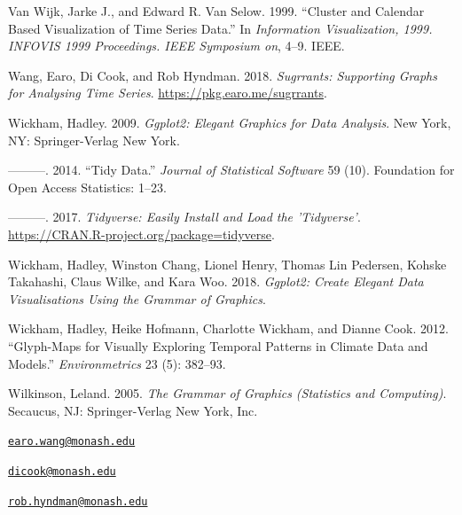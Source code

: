 \leavevmode\hypertarget{ref-VanWijkCluster1999}{}%
Van Wijk, Jarke J., and Edward R. Van Selow. 1999. ``Cluster and
Calendar Based Visualization of Time Series Data.'' In \emph{Information
Visualization, 1999. INFOVIS 1999 Proceedings. IEEE Symposium on}, 4--9.
IEEE.

\leavevmode\hypertarget{ref-R-sugrrants}{}%
Wang, Earo, Di Cook, and Rob Hyndman. 2018. \emph{Sugrrants: Supporting
Graphs for Analysing Time Series}. \url{https://pkg.earo.me/sugrrants}.

\leavevmode\hypertarget{ref-wickham2009ggplot2}{}%
Wickham, Hadley. 2009. \emph{Ggplot2: Elegant Graphics for Data
Analysis}. New York, NY: Springer-Verlag New York.

\leavevmode\hypertarget{ref-wickham2014tidy}{}%
---------. 2014. ``Tidy Data.'' \emph{Journal of Statistical Software}
59 (10). Foundation for Open Access Statistics: 1--23.

\leavevmode\hypertarget{ref-R-tidyverse}{}%
---------. 2017. \emph{Tidyverse: Easily Install and Load the
'Tidyverse'}. \url{https://CRAN.R-project.org/package=tidyverse}.

\leavevmode\hypertarget{ref-R-ggplot2}{}%
Wickham, Hadley, Winston Chang, Lionel Henry, Thomas Lin Pedersen,
Kohske Takahashi, Claus Wilke, and Kara Woo. 2018. \emph{Ggplot2: Create
Elegant Data Visualisations Using the Grammar of Graphics}.

\leavevmode\hypertarget{ref-Wickham2012glyph}{}%
Wickham, Hadley, Heike Hofmann, Charlotte Wickham, and Dianne Cook.
2012. ``Glyph-Maps for Visually Exploring Temporal Patterns in Climate
Data and Models.'' \emph{Environmetrics} 23 (5): 382--93.

\leavevmode\hypertarget{ref-wilkinson2006grammar}{}%
Wilkinson, Leland. 2005. \emph{The Grammar of Graphics (Statistics and
Computing)}. Secaucus, NJ: Springer-Verlag New York, Inc.



\address{%
Earo Wang\\
Monash University\\
Department of Econometrics and Business Statistics,\\ Monash University, VIC 3800\\ Australia\\
}
\href{mailto:earo.wang@monash.edu}{\nolinkurl{earo.wang@monash.edu}}

\address{%
Dianne Cook\\
Monash University\\
Department of Econometrics and Business Statistics,\\ Monash University, VIC 3800\\ Australia\\
}
\href{mailto:dicook@monash.edu}{\nolinkurl{dicook@monash.edu}}

\address{%
Rob J Hyndman\\
Monash University\\
Department of Econometrics and Business Statistics,\\ Monash University, VIC 3800\\ Australia\\
}
\href{mailto:rob.hyndman@monash.edu}{\nolinkurl{rob.hyndman@monash.edu}}


